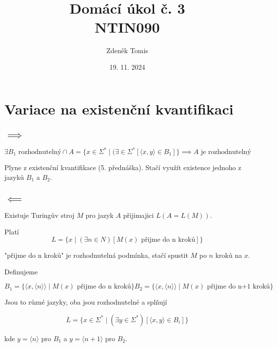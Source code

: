 \documentclass{article}
\title{%
    Domácí úkol č. 3   \\
    NTIN090
}
\author{Zdeněk Tomis}
\date{19. 11. 2024}
\begin{document}
\maketitle


\section{Variace na existenční kvantifikaci}

\subsection{$\implies$}

\begin{equation}
    \exists B_1 \text { rozhodnutelný} \cap
    A=\{ x \in \Sigma^* \mid(\exists  \in \Sigma^* [\langle x,y\rangle \in B_1]\} \implies A \text{ je rozhodnutelný} 
\end{equation}

Plyne z existenční kvantifikace (5. přednáška). Stačí využít existence jednoho z jazyků $B_1$ a $B_2$.

\subsection{$\impliedby$}

Existuje Turingův stroj $M$ pro jazyk $A$ přijimajici $L(A = L(M))$.

Platí 
\begin{equation}
    L = \{x \mid (\exists n \in N)[M(x)\text{ přijme do n kroků}]\}
\end{equation}

"přijme do n kroků" je rozhodnutelná podmínka, stačí spustit $M$ po $n$ kroků na $x$.

Definujeme 

\begin{equation} 
    B_1 = \{\langle x , \langle n \rangle \rangle \mid M(x)\text{ přijme do n kroků}\}
    B_2 = \{\langle x , \langle n \rangle \rangle \mid M(x)\text{ přijme do n+1 kroků}\}
\end{equation}

Jsou to různé jazyky, oba jsou rozhodnutelné a splňují 

\begin{equation}
    L = \{ x \in \Sigma^* \mid (\exists y \in \Sigma^* )[ \langle x,y \rangle \in B_i ]\}
\end{equation}

kde $y = \langle n \rangle $ pro $B_1$ a $y = \langle n+1 \rangle $ pro $B_2$.
\end{document}
